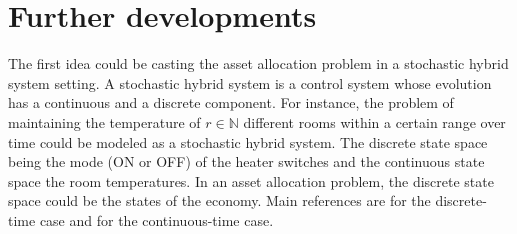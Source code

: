 \section{Further developments}
The first idea could be casting the asset allocation problem in a stochastic hybrid system setting. A stochastic hybrid system is a control system whose evolution has a continuous and a discrete component. For instance, the problem of maintaining the temperature of $r \in \mathbb{N}$ different rooms within a certain range over time could be modeled as a stochastic hybrid system. The discrete state space being the mode (ON or OFF) of the heater switches and the continuous state space the room temperatures. In an asset allocation problem, the discrete state space could be the states of the economy. Main references are \cite{ABATE2008} for the discrete-time case and \cite{Boj2012} for the continuous-time case.






